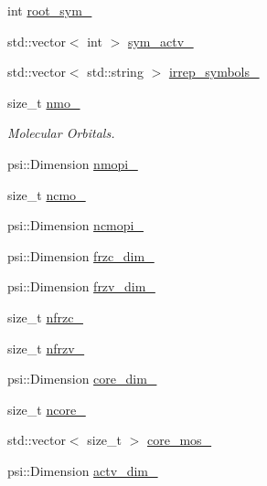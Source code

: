 \begin{DoxyCompactItemize}
int \mbox{\hyperlink{classforte_1_1_f_c_i___m_o_a2ef667274626e4ddc7db7e62fb9f74b6}{root\+\_\+sym\+\_\+}}
\item 
std\+::vector$<$ int $>$ \mbox{\hyperlink{classforte_1_1_f_c_i___m_o_a48b8dd2fbaefc3ade48e5297b890aae4}{sym\+\_\+actv\+\_\+}}
\item 
std\+::vector$<$ std\+::string $>$ \mbox{\hyperlink{classforte_1_1_f_c_i___m_o_afc7f1fba4636a17f30b222c14834659d}{irrep\+\_\+symbols\+\_\+}}
\item 
size\+\_\+t \mbox{\hyperlink{classforte_1_1_f_c_i___m_o_a542386abe3fadb34380653039d06ba95}{nmo\+\_\+}}
\begin{DoxyCompactList}\small\item\em Molecular Orbitals. \end{DoxyCompactList}\item 
psi\+::\+Dimension \mbox{\hyperlink{classforte_1_1_f_c_i___m_o_a63cf1a2e7440dd9c1b0dd079321e7c7c}{nmopi\+\_\+}}
\item 
size\+\_\+t \mbox{\hyperlink{classforte_1_1_f_c_i___m_o_a27574a3a4838deddc99cc33c6b5b3f16}{ncmo\+\_\+}}
\item 
psi\+::\+Dimension \mbox{\hyperlink{classforte_1_1_f_c_i___m_o_a420dd4857f5bb3cb68ed7bcdeb394887}{ncmopi\+\_\+}}
\item 
psi\+::\+Dimension \mbox{\hyperlink{classforte_1_1_f_c_i___m_o_a96515599234ec4dc5c333e7cccdaa1f3}{frzc\+\_\+dim\+\_\+}}
\item 
psi\+::\+Dimension \mbox{\hyperlink{classforte_1_1_f_c_i___m_o_a463f8607b3fb54f8c726b4e35b35c716}{frzv\+\_\+dim\+\_\+}}
\item 
size\+\_\+t \mbox{\hyperlink{classforte_1_1_f_c_i___m_o_ac34e46d3d74f7bb2264133a17c8fc0b3}{nfrzc\+\_\+}}
\item 
size\+\_\+t \mbox{\hyperlink{classforte_1_1_f_c_i___m_o_a9fbcc4393b5c2ae232281165f4d24903}{nfrzv\+\_\+}}
\item 
psi\+::\+Dimension \mbox{\hyperlink{classforte_1_1_f_c_i___m_o_a7f9b147b89d98766b8803ad8a0d6961f}{core\+\_\+dim\+\_\+}}
\item 
size\+\_\+t \mbox{\hyperlink{classforte_1_1_f_c_i___m_o_a6faa7e41178673c13e7253408376f0a5}{ncore\+\_\+}}
\item 
std\+::vector$<$ size\+\_\+t $>$ \mbox{\hyperlink{classforte_1_1_f_c_i___m_o_aff00e18684ee96e25bea6b34f3a9a61d}{core\+\_\+mos\+\_\+}}
\item 
psi\+::\+Dimension \mbox{\hyperlink{classforte_1_1_f_c_i___m_o_a197b0110e1dc2a6edb763a9167a5174b}{actv\+\_\+dim\+\_\+}}
\item 

\end{DoxyCompactItemize}
